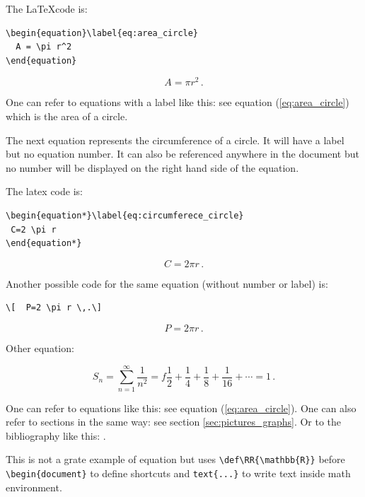 \documentclass[12pt,a4paper]{article}
\theoremstyle{definition}
\theoremstyle{remark}
\def\RR{\mathbb{R}}
\begin{document}
The \LaTeX code is:
\begin{verbatim}
\begin{equation}\label{eq:area_circle}
  A = \pi r^2  
\end{equation}
\end{verbatim}

\begin{equation}\label{eq:area_circle}
  A = \pi r^2  \,.
\end{equation}

One can refer to equations with a label like this: see equation (\ref{eq:area_circle}) which is the area of a circle.

The next equation represents the circumference of a circle. It will have a label but no equation number. It can also be referenced anywhere in the document but no number will be displayed on the right hand side of the equation.

The latex code is:
\begin{verbatim}
\begin{equation*}\label{eq:circumferece_circle}
 C=2 \pi r
\end{equation*}
\end{verbatim}

\begin{equation*}\label{eq:circumferece_circle}
 C=2 \pi r \,.
\end{equation*}
 
 Another possible code for the same equation (without number or label) is:
 \begin{verbatim}
\[  P=2 \pi r \,.\]
\end{verbatim}

\[  P=2 \pi r \,.\]

Other equation:

\begin{equation}\label{eq:infsum_1_n}
S_n = \sum_{n=1}^{\infty} \frac{1}{n^2}
    = f\frac{1}{2}+\frac{1}{4}+\frac{1}{8}+\frac{1}{16}+\cdots
    = 1 \,.
\end{equation}

One can refer to equations like this: see equation (\ref{eq:area_circle}). One can also
refer to sections in the same way: see section \ref{sec:pictures_graphs}. Or
to the bibliography like this: \cite{Someone2000}.

This is not a grate example of equation but uses \verb-\def\RR{\mathbb{R}}- before \verb-\begin{document}- to define shortcuts and \verb-text{...}- to write text inside math environment.
\end{document}

